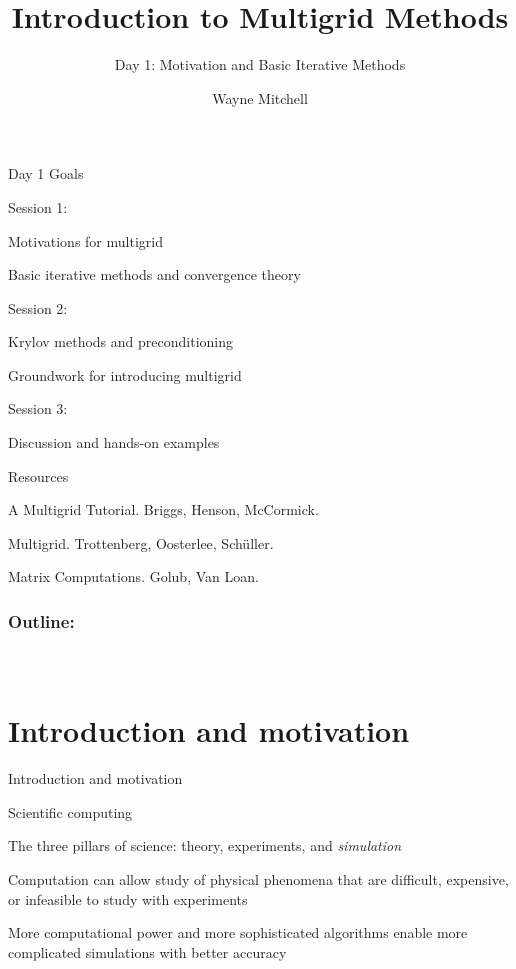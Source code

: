 \documentclass[18pt,xcolor=table]{beamer}
\title[Multigrid]{Introduction to Multigrid Methods}
\subtitle{Day 1: Motivation and Basic Iterative Methods}
\author[Mitchell]{Wayne Mitchell}
\institute{\pgfuseimage{logo}\\Universit\"at Heidelberg\\Institut f\"ur Technische Informatik}
\date[]{\alert{}}
\begin{document}


\DeclareRobustCommand{\Chi}{\raisebox{2pt}{$\chi$}}

\begin{frame}{}
\begin{block}{Day 1 Goals}
\bit
\item Session 1:
\bit
\item Motivations for multigrid
\item Basic iterative methods and convergence theory
\eit
\item Session 2:
\bit
\item Krylov methods and preconditioning
\item Groundwork for introducing multigrid
\eit
\item Session 3:
\bit
\item Discussion and hands-on examples
\eit
\eit
\end{block}
\end{frame}


\begin{frame}{}
\begin{block}{Resources}
\bit
\item A Multigrid Tutorial. Briggs, Henson, McCormick.
\item Multigrid. Trottenberg, Oosterlee, Sch\"uller.
\item Matrix Computations. Golub, Van Loan.
\eit
\end{block}
\end{frame}

\begin{frame}
\frametitle{\bf Outline:}
\framesubtitle{~~}
\tableofcontents
\end{frame}


\section{Introduction and motivation}


\begin{frame}{Introduction and motivation}
\begin{block}{Scientific computing}
\bit
\item The three pillars of science: theory, experiments, and \emph{simulation}
\item Computation can allow study of physical phenomena that are difficult, expensive, or infeasible to study with experiments
\item More computational power and more sophisticated algorithms enable more complicated simulations with better accuracy
\eit
\end{block}
\end{frame}
\end{document}
